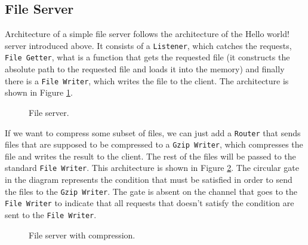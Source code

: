 \subsection{File Server}
\label{sec:fileServer}
Architecture of a simple file server follows the architecture of the Hello world!
server introduced above. It consists of a \texttt{Listener}, which catches the requests,
\texttt{File Getter}, what is a function that gets the requested file (it
constructs the absolute path to the requested file and loads it into the memory) 
and finally there is a \texttt{File Writer}, which
writes the file to the client. The architecture is shown in Figure \ref{fig:fileServer}.
\begin{figure}[h]
\centering
{}
\caption[scale=1.0]{File server.}
\label{fig:fileServer}
\end{figure}

If we want to compress some subset of files, we can just add a \texttt{Router}
that sends files that are supposed to be compressed to a \texttt{Gzip Writer}, which
compresses the file and writes the result to the client. The rest of the files
will be passed to the standard \texttt{File Writer}. This architecture is shown in
Figure \ref{fig:fileServer2}. The circular gate in the diagram represents 
the condition that must be satisfied in order to send the files
to the \texttt{Gzip Writer}. The gate is absent on the channel that goes to
the \texttt{File Writer} to indicate that all requests that doesn't
satisfy the condition are sent to the \texttt{File Writer}.

\begin{figure}[h]
\centering
{}
\caption[scale=1.0]{File server with compression.}
\label{fig:fileServer2}
\end{figure}

